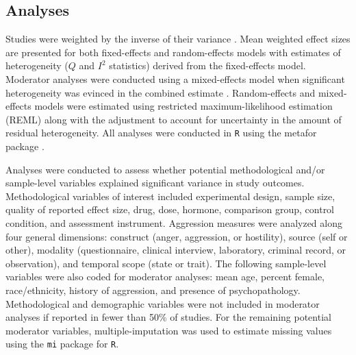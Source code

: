 \subsection{Analyses}
Studies were weighted by the inverse of their variance \parencite{Shadish09}. Mean weighted effect sizes are presented for both fixed-effects and random-effects models with estimates of heterogeneity ($Q$ and $I^2$ statistics) derived from the fixed-effects model. Moderator analyses were conducted using a mixed-effects model when significant heterogeneity was evinced in the combined estimate \parencite[see][]{Lipsey01}. Random-effects and mixed-effects models were estimated using restricted maximum-likelihood estimation (REML) along with the \textcite{Knapp03} adjustment to account for uncertainty in the amount of residual heterogeneity.  All analyses were conducted in \texttt{R} using the metafor package \parencite{metafor}.  


Analyses were conducted to assess whether potential methodological and\slash or sample-level variables explained significant variance in study outcomes. Methodological variables of interest included experimental design, sample size, quality of reported effect size, drug, dose, hormone, comparison group, control condition, and assessment instrument. Aggression measures were analyzed along four general dimensions: construct (anger, aggression, or hostility), source (self or other), modality (questionnaire, clinical interview, laboratory, criminal record, or observation), and temporal scope (state or trait). The following sample-level variables were also coded for moderator analyses: mean age, percent female, race/ethnicity, history of aggression, and presence of psychopathology. Methodological and demographic variables were not included in moderator analyses if reported in fewer than 50\% of studies. For the remaining potential moderator variables, multiple-imputation \parencite{Pigott09} was used to estimate missing values using the \texttt{mi} package \parencite{mi} for \texttt{R}. 


